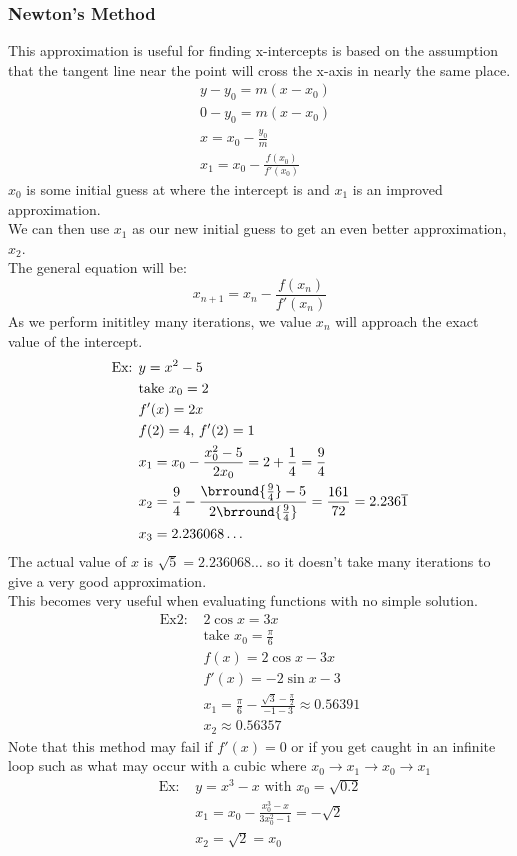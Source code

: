 \subsubsection{Newton's Method}
This approximation is useful for finding x-intercepts is based on the assumption that the tangent line near the point will cross the x-axis in nearly the same place.
\begin{align*}
    &y-y_0=m(x-x_0)\\
    &0-y_0=m(x-x_0)\\
    &x=x_0-\frac{y_0}{m}\\
    &x_1=x_0-\frac{f(x_0)}{f'(x_0)}
\end{align*}
$x_0$ is some initial guess at where the intercept is and $x_1$ is an improved approximation.\\
We can then use $x_1$ as our new initial guess to get an even better approximation, $x_2$.\\
The general equation will be:
$$x_{n+1}=x_n-\frac{f(x_n)}{f'(x_n)}$$
As we perform inititley many iterations, we value $x_n$ will approach the exact value of the intercept.
\begin{align*}
    \text{Ex: }&y=x^2-5\\
    &\text{take }x_0=2\\
    &f'(x)=2x\\
    &f(2)=4,\,f'(2)=1\\
    &x_1=x_0-\frac{x_0^2-5}{2x_0}=2+\frac{1}{4}=\frac{9}{4}\\
    &x_2=\frac{9}{4}-\frac{\brround{\frac{9}{4}}-5}{2\brround{\frac{9}{4}}}=\frac{161}{72}=2.236\overline{1}\\
    &x_3=2.236068\ldots
\end{align*}
The actual value of $x$ is $\sqrt{5}=2.236068\ldots$ so it doesn't take many iterations to give a very good approximation.\\
This becomes very useful when evaluating functions with no simple solution.
\begin{align*}
    \text{Ex2: }&2\cos x=3x\\
    &\text{take }x_0=\frac{\pi}{6}\\
    &f(x)=2\cos x-3x\\
    &f'(x)=-2\sin x-3\\
    &x_1=\frac{\pi}{6}-\frac{\sqrt{3}-\frac{\pi}{2}}{-1-3}\approx 0.56391\\
    &x_2\approx 0.56357
\end{align*}
Note that this method may fail if $f'(x)=0$ or if you get caught in an infinite loop such as what may occur with a cubic where $x_0\to x_1\to x_0\to x_1$
\begin{align*}
    \text{Ex: }&y=x^3-x\text{ with }x_0=\sqrt{0.2}\\
    &x_1=x_0-\frac{x_0^3-x}{3x_0^2-1}=-\sqrt{2}\\
    &x_2=\sqrt{2}=x_0
\end{align*}